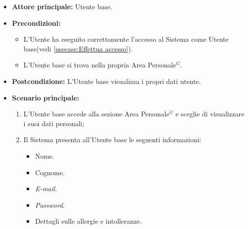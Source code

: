 \label{usecase:Visualizzazione dati utente}
\begin{itemize}
	\item \textbf{Attore principale:} Utente base.

	\item \textbf{Precondizioni:}
	\begin{itemize}
        \item L'Utente ha eseguito correttamente l'accesso al Sistema come Utente base(vedi \autoref{usecase:Effettua accesso}).
        \item L'Utente base si trova nella propria Area Personale$^G$.
    \end{itemize}

	\item \textbf{Postcondizione:} L'Utente base visualizza i propri dati utente.

	\item \textbf{Scenario principale:}
	      \begin{enumerate}
		      \item L'Utente base accede alla sezione Area Personale$^G$ e sceglie di visualizzare i suoi dati personali;
		      \item Il Sistema presenta all'Utente base le seguenti informazioni:
              \begin{itemize}
                \item Nome.
                \item Cognome.
                \item \textit{E-mail}.
                \item \textit{Password}.
                \item Dettagli sulle allergie e intolleranze.
              \end{itemize}
	      \end{enumerate}
\end{itemize}
